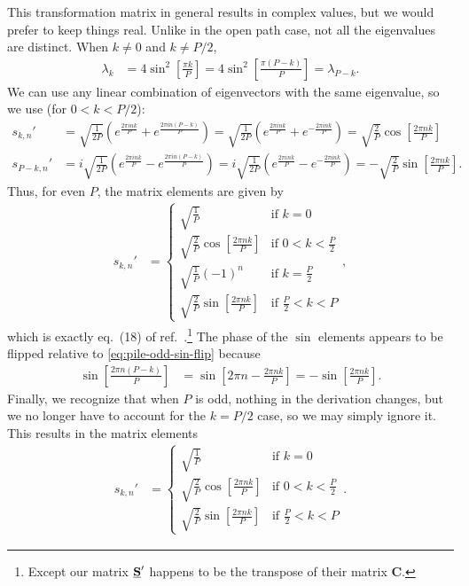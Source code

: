 This transformation matrix in general results in complex values, but we would prefer to keep things real.
Unlike in the open path case, not all the eigenvalues are distinct.
When $k \ne 0$ and $k \ne P/2$,
\begin{align}
	\lambda_k
	&= 4 \sin^2{\left[ \frac{\pi k}{P} \right]}
	= 4 \sin^2{\left[ \frac{\pi (P - k)}{P} \right]}
	= \lambda_{P-k}.
\end{align}
We can use any linear combination of eigenvectors with the same eigenvalue, so we use (for $0 < k < P/2$):
\begin{subequations}
\begin{align}
	s_{k,n}'
	&= \sqrt{\frac{1}{2 P}} \left( e^{\frac{2 \pi i n k}{P}} + e^{\frac{2 \pi i n (P - k)}{P}} \right)
	= \sqrt{\frac{1}{2 P}} \left( e^{\frac{2 \pi i n k}{P}} + e^{-\frac{2 \pi i n k}{P}} \right)
	= \sqrt{\frac{2}{P}} \cos{\left[ \frac{2 \pi n k}{P} \right]} \\
	s_{P-k,n}'
	&= i \sqrt{\frac{1}{2 P}} \left( e^{\frac{2 \pi i n k}{P}} - e^{\frac{2 \pi i n (P - k)}{P}} \right)
	= i \sqrt{\frac{1}{2 P}} \left( e^{\frac{2 \pi i n k}{P}} - e^{-\frac{2 \pi i n k}{P}} \right)
	= -\sqrt{\frac{2}{P}} \sin{\left[ \frac{2 \pi n k}{P} \right]}.
			\label{eq:pile-odd-sin-flip}
\end{align}
\end{subequations}
Thus, for even $P$, the matrix elements are given by
\begin{align}
	s_{k,n}'
	&= \begin{cases}
			\sqrt{\frac{1}{P}} & \text{if } k = 0 \\
			\sqrt{\frac{2}{P}} \cos{\left[ \frac{2 \pi n k}{P} \right]} & \text{if } 0 < k < \frac{P}{2} \\
			\sqrt{\frac{1}{P}} (-1)^n & \text{if } k = \frac{P}{2} \\
			\sqrt{\frac{2}{P}} \sin{\left[ \frac{2 \pi n k}{P} \right]} & \text{if } \frac{P}{2} < k < P
		\end{cases},
\end{align}
which is exactly eq.~(18) of ref.~\cite{ceriotti2010efficient}.\footnote{
	Except our matrix $\underline{\bm{\mathbf{S}}}'$ happens to be the transpose of their matrix $\mathbf{C}$.
}
The phase of the $\sin$ elements appears to be flipped relative to \cref{eq:pile-odd-sin-flip} because
\begin{align}
	\sin{\left[ \frac{2 \pi n (P - k)}{P} \right]}
	&= \sin{\left[ 2 \pi n - \frac{2 \pi n k}{P} \right]}
	= -\sin{\left[ \frac{2 \pi n k}{P} \right]}.
\end{align}
Finally, we recognize that when $P$ is odd, nothing in the derivation changes, but we no longer have to account for the $k = P/2$ case, so we may simply ignore it.
This results in the matrix elements
\begin{align}
	s_{k,n}'
	&= \begin{cases}
			\sqrt{\frac{1}{P}} & \text{if } k = 0 \\
			\sqrt{\frac{2}{P}} \cos{\left[ \frac{2 \pi n k}{P} \right]} & \text{if } 0 < k < \frac{P}{2} \\
			\sqrt{\frac{2}{P}} \sin{\left[ \frac{2 \pi n k}{P} \right]} & \text{if } \frac{P}{2} < k < P
		\end{cases}.
			\label{eq:pile-transformation-odd-P}
\end{align}
